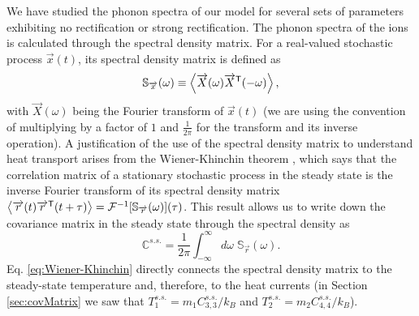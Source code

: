 We have studied the phonon spectra of our model for several sets of parameters exhibiting no rectification or strong rectification. The phonon spectra of the ions is calculated through the spectral density matrix. For a real-valued stochastic process $\overrightarrow{x}(t)$, its spectral density matrix is defined as \cite{Sarkka2019}
%
\begin{equation}
  \mathbb{S}_{\overrightarrow{x}}(\omega) \equiv \expval{ \overrightarrow{X}(\omega) \overrightarrow{X}^\mathsf{T}(-\omega) },
  \label{eq:SpectralDensityDefinition}
\end{equation}
%
with $\overrightarrow{X}(\omega)$ being the Fourier transform of $\overrightarrow{x}(t)$ (we are using the convention of multiplying by a factor of $1$ and $\frac{1}{2\pi}$ for the transform and its inverse operation). A justification of the use of the spectral density matrix to understand heat transport arises from the Wiener-Khinchin theorem \cite{Sarkka2019}, which says that the correlation matrix of a stationary stochastic process in the steady state is the inverse Fourier transform of its spectral density matrix $\expval{\overrightarrow{r}(t)\overrightarrow{r}^\mathsf{T}(t+\tau)} = \mathcal{F}^{-1}[\mathbb{S}_{\overrightarrow{r}}(\omega)](\tau)$. This result allows us to write down the covariance matrix in the steady state through the spectral density as
%
\begin{equation}
  \mathbb{C}^{s.s.} = \frac{1}{2\pi} \int_{-\infty}^{\infty}d\omega\;\mathbb{S}_{\overrightarrow{r}}(\omega).
  \label{eq:Wiener-Khinchin}
\end{equation}
%
Eq. \eqref{eq:Wiener-Khinchin} directly connects the spectral density matrix to the steady-state temperature and, therefore, to the heat currents (in Section \ref{sec:covMatrix} we saw that  $T_1^{s.s.} = {m_1 C_{3,3}^{s.s.}}/{k_B}$ and $T_2^{s.s.} = {m_2 C_{4,4}^{s.s.}}/{k_B}$).


